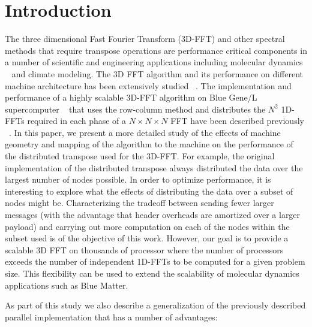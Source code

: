 \section {Introduction}

The three dimensional Fast Fourier Transform (3D-FFT) and other spectral
methods that require transpose operations are performance critical
components in a number of scientific and engineering applications
including molecular dynamics   ~\cite{bluematter_p5:2006,Fitch2003,Lippert2007,amber:95,Kale1999}
 and climate modeling. %
The 3D FFT algorithm and its performance on different machine architecture has been extensively studied ~\cite{johnson97,FrJo98,Cramer00,Ding95,edelman99,Zapata1990,Agarwal99,Haynes00,Kettimuthu2005,Anupindi1994}.
The implementation and performance of a highly scalable 3D-FFT
algorithm on Blue Gene/L supercomputer  ~\cite{Gara2005,Adiga2002} that uses the row-column method and distributes the $N^2$
1D-FFTs required in each phase of a $N\times N\times N$ FFT have been
described previously ~\cite{Eleftheriou2005b,Eleftheriou2005}.
In this paper, we present a more detailed study of the effects of
machine geometry and mapping of the algorithm to the machine on the
performance of the distributed transpose used for the 3D-FFT.  For
example, the original implementation of the distributed transpose
always distributed the data over the largest number of nodes possible.
In order to optimize performance, it is interesting
to explore what the effects of distributing the data over a subset
of nodes might be. Characterizing the tradeoff between
sending fewer larger messages (with the advantage that header
overheads are amortized over a larger payload) and carrying out more
computation on each of the nodes within the subset used
is of the objective of this work.  However, our goal is to provide a 
scalable 3D FFT on thousands of processor where the number of processors
exceeds the number of independent 1D-FFTs to be computed for a given problem size.
This flexibility can be used to extend the scalability of molecular
dynamics applications such as Blue Matter.

As part of this study we also
describe a generalization of the previously described parallel
implementation that has a number of advantages:

